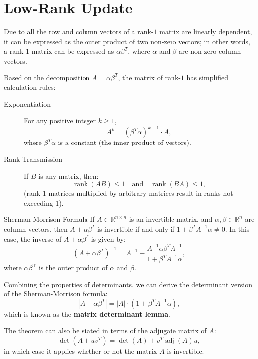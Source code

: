 \documentclass[11pt]{../../TexTemplate/elegantbook} %
\begin{document}
\section{Low-Rank Update}
Due to all the row and column vectors of a rank-\(1\) matrix are linearly dependent,
it can be expressed as the outer product of two non-zero vectors;
in other words, a rank-\(1\) matrix can be expressed as \( \alpha \beta^T \),
where \( \alpha \) and \( \beta \) are non-zero column vectors.

Based on the decomposition \( A = \alpha \beta^T \), the matrix of rank-\(1\) has simplified calculation rules:
\begin{property}
    \begin{description}
        \item [Exponentiation]  
        For any positive integer \( k \geq 1 \),
        \[
        A^k = (\beta^T\alpha)^{k-1} \cdot A,
        \]
        where \( \beta^T\alpha \) is a constant (the inner product of vectors).
        \item [Rank Transmission]  
        If \( B \) is any matrix, then:
        \[
        \operatorname{rank}(AB) \leq 1 \quad \text{and} \quad \operatorname{rank}(BA) \leq 1,
        \]
        (rank 1 matrices multiplied by arbitrary matrices result in ranks not exceeding 1).
    \end{description}
\end{property}



\begin{theorem}{Sherman-Morrison Formula}
    If \( A\in \mathbb{R}^{n\times n} \) is an invertible matrix, 
    and \( \alpha, \beta\in \mathbb{R}^n \) are column vectors, 
    then \( A + \alpha \beta^T \) is invertible if and only if \( 1 + \beta^T A^{-1} \alpha \neq 0 \). 
    In this case, the inverse of \( A + \alpha \beta^T \) is given by:
    \[
    \left(A + \alpha \beta^T\right)^{-1} = A^{-1} - \frac{A^{-1} \alpha \beta^T A^{-1}}{1 + \beta^T A^{-1} \alpha},
    \]
    where \(\alpha\beta^{\mathrm{T}}\) is the outer product of \(\alpha\) and \(\beta\).
\end{theorem}

\begin{note}
    Combining the properties of determinants, 
    we can derive the determinant version of the Sherman-Morrison formula:
    \[
    \left|A + \alpha \beta^T\right| = |A| \cdot \left(1 + \beta^T A^{-1} \alpha\right),
    \]
    which is known as the \textbf{matrix determinant lemma}.

    The theorem can also be stated in terms of the adjugate matrix of \( A \):
    \[
    \det(A + uv^T) = \det(A) + v^T \operatorname{adj}(A) u,
    \]
    in which case it applies whether or not the matrix \( A \) is invertible.
\end{note}
\end{document}
